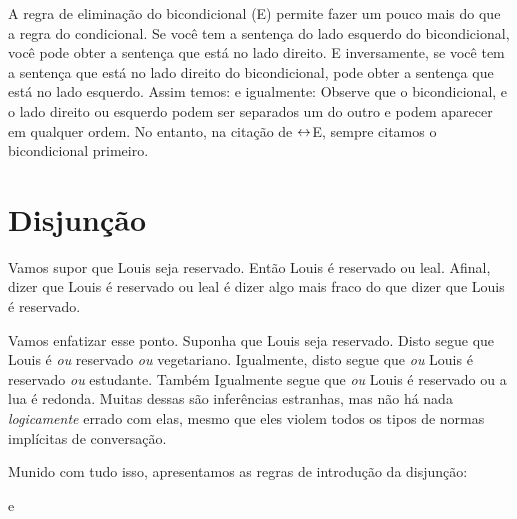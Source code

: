 A regra de elimina\c c\~ao do bicondicional ({\eiff}E) permite fazer um pouco mais do que a regra do condicional.  Se voc\^e tem a senten\c ca do lado esquerdo do bicondicional, voc\^e pode obter a senten\c ca que est\'a no lado direito. E inversamente, se voc\^e tem a senten\c ca que est\'a no lado direito do bicondicional, pode obter a senten\c ca que est\'a no lado esquerdo. Assim temos:
e igualmente:
Observe que o bicondicional, e o lado  direito ou esquerdo podem ser separados um  do outro e podem aparecer em qualquer ordem. No entanto, na cita\c c\~ao de $\leftrightarrow$E, sempre citamos o  bicondicional primeiro.


\section{Disjun\c c\~ao}
Vamos supor que Louis seja reservado.  Ent\~ao Louis \'e reservado ou leal. Afinal, dizer que Louis \'e reservado ou leal \'e dizer algo mais fraco do que dizer que Louis \'e reservado. 

Vamos enfatizar esse ponto. Suponha que Louis seja reservado. Disto segue que  Louis \'e \emph{ou} reservado \emph{ou} vegetariano.  Igualmente,  disto segue que \emph{ou} Louis   \'e reservado \emph{ou} estudante. Tamb\'em   Igualmente segue que   \emph{ou} Louis \'e reservado ou a lua \'e redonda. Muitas dessas s\~ao infer\^encias estranhas, mas n\~ao h\'a nada \emph{logicamente} errado com elas, mesmo que eles violem todos os tipos de normas impl\'icitas de conversa\c c\~ao.

Munido com tudo isso, apresentamos as regras de introdu\c c\~ao da disjun\c c\~ao:

e

